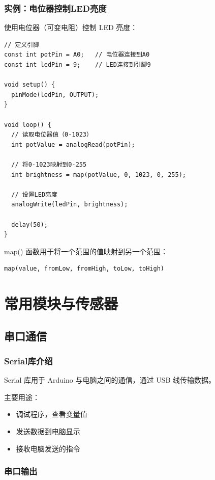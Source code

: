 \documentclass[12pt,UTF8]{ctexbook}
\begin{document}
\section{实例：电位器控制LED亮度}

使用电位器（可变电阻）控制 LED 亮度：

\begin{lstlisting}
// 定义引脚
const int potPin = A0;   // 电位器连接到A0
const int ledPin = 9;    // LED连接到引脚9

void setup() {
  pinMode(ledPin, OUTPUT);
}

void loop() {
  // 读取电位器值（0-1023）
  int potValue = analogRead(potPin);
  
  // 将0-1023映射到0-255
  int brightness = map(potValue, 0, 1023, 0, 255);
  
  // 设置LED亮度
  analogWrite(ledPin, brightness);
  
  delay(50);
}
\end{lstlisting}

map() 函数用于将一个范围的值映射到另一个范围：
\begin{lstlisting}
map(value, fromLow, fromHigh, toLow, toHigh)
\end{lstlisting}

\part{常用模块与传感器}

\chapter{串口通信}

\section{Serial库介绍}

Serial 库用于 Arduino 与电脑之间的通信，通过 USB 线传输数据。

主要用途：
\begin{itemize}
    \item 调试程序，查看变量值
    \item 发送数据到电脑显示
    \item 接收电脑发送的指令
\end{itemize}

\section{串口输出}
\end{document}
